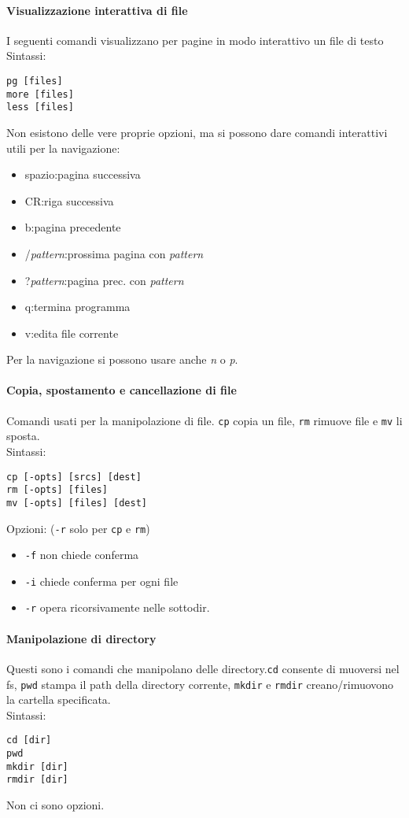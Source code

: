 \documentclass[a4paper]{article}
\begin{document}
\paragraph{Visualizzazione interattiva di file}I seguenti comandi visualizzano per pagine in modo interattivo un file di testo \\
Sintassi:
\begin{verbatim}
pg [files]
more [files]
less [files]
\end{verbatim}

Non esistono delle vere proprie opzioni, ma si possono dare comandi interattivi utili per la navigazione:
\begin{itemize}
\item spazio:pagina successiva
\item CR:riga successiva
\item b:pagina precedente
\item /\textit{pattern}:prossima pagina con \textit{pattern}
\item ?\textit{pattern}:pagina prec. con \textit{pattern}
\item q:termina programma
\item v:edita file corrente
\end{itemize}
Per la navigazione si possono usare anche \textit{n} o \textit{p}.

\paragraph{Copia, spostamento e cancellazione di file} Comandi usati per la manipolazione di file. \verb|cp| copia un file, \verb|rm| rimuove file e \verb|mv| li sposta.\\
Sintassi:
\begin{verbatim}
cp [-opts] [srcs] [dest]
rm [-opts] [files]
mv [-opts] [files] [dest]
\end{verbatim}
Opzioni: (\verb|-r| solo per \verb|cp| e \verb|rm|)
\begin{itemize}
\item \verb|-f| non chiede conferma
\item \verb|-i| chiede conferma per ogni file
\item \verb|-r| opera ricorsivamente nelle sottodir.
\end{itemize}

\paragraph{Manipolazione di directory} Questi sono i comandi che manipolano delle directory.\verb|cd| consente di muoversi nel fs, \verb|pwd| stampa il path della directory corrente, \verb|mkdir| e \verb|rmdir| creano/rimuovono la cartella specificata.\\
Sintassi:
\begin{verbatim}
cd [dir]
pwd
mkdir [dir]
rmdir [dir]
\end{verbatim}
Non ci sono opzioni.
\end{document}
